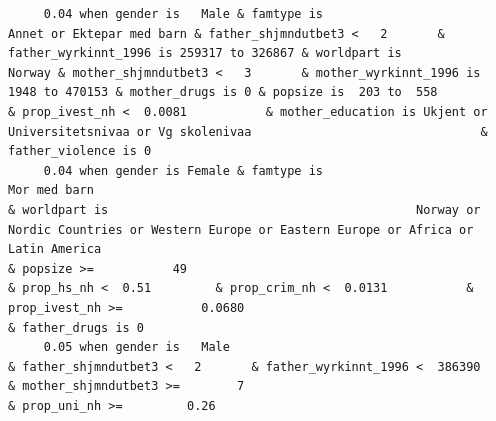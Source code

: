 \documentclass[
  letterpaper,
  DIV=11,
  numbers=noendperiod]{scrreprt}
\begin{document}
\begin{verbatim}
     0.04 when gender is   Male & famtype is                                        Annet or Ektepar med barn & father_shjmndutbet3 <   2       & father_wyrkinnt_1996 is 259317 to 326867 & worldpart is                                                                                                                              Norway & mother_shjmndutbet3 <   3       & mother_wyrkinnt_1996 is   1948 to 470153 & mother_drugs is 0 & popsize is  203 to  558                                                                                                                                    & prop_ivest_nh <  0.0081           & mother_education is Ukjent or Universitetsnivaa or Vg skolenivaa                                & father_violence is 0                                                                                                               
     0.04 when gender is Female & famtype is                                                     Mor med barn                                                                              & worldpart is                                           Norway or Nordic Countries or Western Europe or Eastern Europe or Africa or Latin America                                                                                                  & popsize >=           49                                                                    & prop_hs_nh <  0.51         & prop_crim_nh <  0.0131           & prop_ivest_nh >=           0.0680                                                                                                                          & father_drugs is 0                                                                                           
     0.05 when gender is   Male                                                                               & father_shjmndutbet3 <   2       & father_wyrkinnt_1996 <  386390                                                                                                                                                              & mother_shjmndutbet3 >=        7                                                                                          & prop_uni_nh >=         0.26                                                                                                                                                                                                                                                                                                                                                                                 

\end{verbatim}
\end{document}
